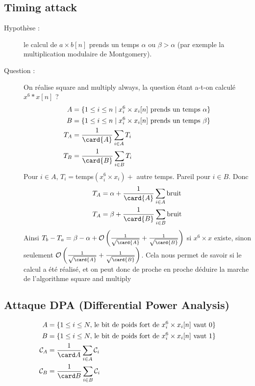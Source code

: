         \subsection{Timing attack}
            \begin{description}
                \item[Hypothèse :] le calcul de $a \times b [n]$ prends un temps $\alpha$ ou $\beta > \alpha$ (par exemple la multiplication modulaire de Montgomery). 
                \item[Question :] On réalise square and multiply always, la question étant a-t-on calculé $x^6*x [n]$ ? 
                \begin{align*}
                    A &= \{1 \leq i \leq n \mid x_i^6 \times x_i [n] \text{ prends un temps } \alpha\} \\
                    B &= \{1 \leq i \leq n \mid x_i^6 \times x_i [n] \text{ prends un temps } \beta\} \\
                    T_A &= \frac{1}{\card{A}} \sum_{i \in A} T_i \\
                    T_B &= \frac{1}{\card{B}} \sum_{i \in B} T_i \\
                \end{align*}
                Pour $i \in A$, $T_i =$temps$(x_i^6 \times x_i) +$ autre temps. Pareil pour $i \in B$. Donc
                \begin{align*}
                    T_A &= \alpha + \frac{1}{\card{A}} \sum_{i \in A} \text{bruit} \\
                    T_A &= \beta + \frac{1}{\card{B}} \sum_{i \in B} \text{bruit} \\
                \end{align*}
                Ainsi $T_b - T_a = \beta - \alpha + \mathcal{O} \left(\frac 1{\sqrt{\card{A}}} + \frac 1{\sqrt{\card{B}}} \right)$ si $x^6 \times x$ existe, sinon seulement $\mathcal{O} \left(\frac 1{\sqrt{\card{A}}} + \frac 1{\sqrt{\card{B}}} \right)$. Cela nous permet de savoir si le calcul a été réalisé, et on peut donc de proche en proche déduire la marche de l'algorithme square and multiply
            \end{description}

        \subsection{Attaque DPA (Differential Power Analysis)}
            \begin{align*}
                A &= \{1 \leq i \leq N,\, \text{le bit de poids fort de } x_i^6 \times x_i [n] \text{ vaut } 0\} \\
                B &= \{1 \leq i \leq N,\, \text{le bit de poids fort de } x_i^6 \times x_i [n] \text{ vaut } 1\} \\
                \mathcal{C}_A &= \frac{1}{\card A} \sum_{i \in A} \mathcal{C}_i \\
                \mathcal{C}_B &= \frac{1}{\card B} \sum_{i \in B} \mathcal{C}_i \\
            \end{align*}

